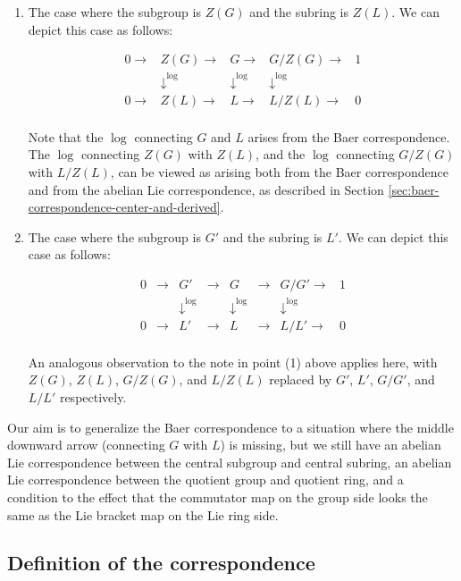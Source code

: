 \begin{enumerate}
\item The case where the subgroup is $Z(G)$ and the subring is
  $Z(L)$. We can depict this case as follows:

  $$\begin{array}{lllll}
    0 \to & Z(G) \to & G \to & G/Z(G) \to & 1 \\
    & \downarrow^{\log} & \downarrow^{\log} & \downarrow^{\log}&  \\
    0  \to & Z(L) \to & L \to & L/Z(L) \to & 0\\
  \end{array}$$

  Note that the $\log$ connecting $G$ and $L$ arises from the Baer
  correspondence. The $\log$ connecting $Z(G)$ with $Z(L)$, and the
  $\log$ connecting $G/Z(G)$ with $L/Z(L)$, can be viewed as arising
  both from the Baer correspondence and from the abelian Lie
  correspondence, as described in Section
  \ref{sec:baer-correspondence-center-and-derived}.
\item The case where the subgroup is $G'$ and the subring is $L'$. We
  can depict this case as follows:

  $$\begin{array}{lllllllll}
    0 & \to & G' & \to & G & \to & G/G' \to & 1 \\
    && \downarrow^{\log} && \downarrow^{\log} && \downarrow^{\log}&  \\
    0  & \to & L' & \to & L & \to & L/L' \to & 0\\
  \end{array}$$
 
  An analogous observation to the note in point (1) above applies
  here, with $Z(G)$, $Z(L)$, $G/Z(G)$, and $L/Z(L)$ replaced by $G'$,
  $L'$, $G/G'$, and $L/L'$ respectively.
\end{enumerate}

Our aim is to generalize the Baer correspondence to a situation where
the middle downward arrow (connecting $G$ with $L$) is missing, but we
still have an abelian Lie correspondence between the central subgroup
and central subring, an abelian Lie correspondence between the
quotient group and quotient ring, and a condition to the effect that
the commutator map on the group side looks the same as the Lie bracket
map on the Lie ring side.

\subsection{Definition of the correspondence}\label{sec:bcuti-def}

